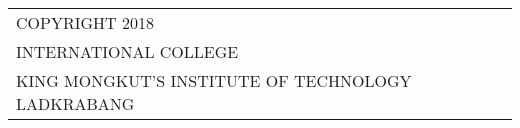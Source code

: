 \begin{titlepage}

\vspace*{\fill}\par

\begin{table}[H]
\begin{tabular}{l}
	{COPYRIGHT 2018} \\
	{INTERNATIONAL COLLEGE} \\ 
	{KING MONGKUT’S INSTITUTE OF TECHNOLOGY LADKRABANG} \\ 
\end{tabular}
\end{table}
\end{titlepage}

\cleardoublepage